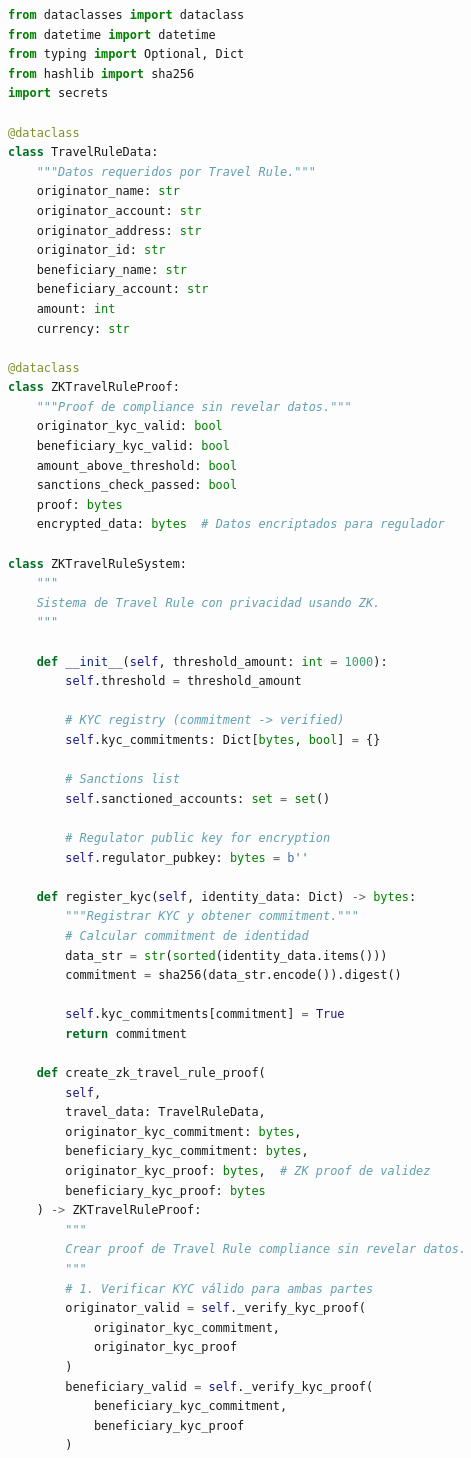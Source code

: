 \documentclass[11pt,a4paper,twoside]{book}
\theoremstyle{definition}
\theoremstyle{remark}
\begin{document}
\begin{lstlisting}[language=Python, caption={ZK Travel Rule Implementation}]
from dataclasses import dataclass
from datetime import datetime
from typing import Optional, Dict
from hashlib import sha256
import secrets

@dataclass
class TravelRuleData:
    """Datos requeridos por Travel Rule."""
    originator_name: str
    originator_account: str
    originator_address: str
    originator_id: str
    beneficiary_name: str
    beneficiary_account: str
    amount: int
    currency: str

@dataclass
class ZKTravelRuleProof:
    """Proof de compliance sin revelar datos."""
    originator_kyc_valid: bool
    beneficiary_kyc_valid: bool
    amount_above_threshold: bool
    sanctions_check_passed: bool
    proof: bytes
    encrypted_data: bytes  # Datos encriptados para regulador

class ZKTravelRuleSystem:
    """
    Sistema de Travel Rule con privacidad usando ZK.
    """
    
    def __init__(self, threshold_amount: int = 1000):
        self.threshold = threshold_amount
        
        # KYC registry (commitment -> verified)
        self.kyc_commitments: Dict[bytes, bool] = {}
        
        # Sanctions list
        self.sanctioned_accounts: set = set()
        
        # Regulator public key for encryption
        self.regulator_pubkey: bytes = b''
    
    def register_kyc(self, identity_data: Dict) -> bytes:
        """Registrar KYC y obtener commitment."""
        # Calcular commitment de identidad
        data_str = str(sorted(identity_data.items()))
        commitment = sha256(data_str.encode()).digest()
        
        self.kyc_commitments[commitment] = True
        return commitment
    
    def create_zk_travel_rule_proof(
        self,
        travel_data: TravelRuleData,
        originator_kyc_commitment: bytes,
        beneficiary_kyc_commitment: bytes,
        originator_kyc_proof: bytes,  # ZK proof de validez
        beneficiary_kyc_proof: bytes
    ) -> ZKTravelRuleProof:
        """
        Crear proof de Travel Rule compliance sin revelar datos.
        """
        # 1. Verificar KYC válido para ambas partes
        originator_valid = self._verify_kyc_proof(
            originator_kyc_commitment, 
            originator_kyc_proof
        )
        beneficiary_valid = self._verify_kyc_proof(
            beneficiary_kyc_commitment,
            beneficiary_kyc_proof
        )
        

\end{lstlisting}
\end{document}
